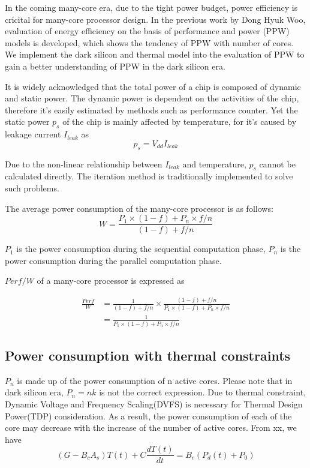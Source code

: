 In the coming many-core era, due to the tight power budget, power efficiency is cricital for
many-core processor design. In the previous work by Dong Hyuk Woo, evaluation of energy
efficiency on the basis of performance and power (PPW) models is developed, which shows the
tendency of PPW with number of cores. We implement the dark silicon and thermal model into the
evaluation of PPW to gain a better understanding of PPW in the dark silicon era.

It is widely acknowledged that the total power of a chip is composed of dynamic and 
static power. The dynamic power is dependent on the activities of the chip, therefore it's 
easily estimated by methods such as performance counter.
Yet the static power $p_{s}$ of the chip is mainly affected by temperature, for it's caused by
leakage current $I_{leak}$ as
\begin{equation}\label{ps}
p_{s} = V_{dd}I_{leak}
\end{equation}

Due to the non-linear relationship between $I_{leak}$ and temperature, $p_{s}$ cannot be
calculated directly. The iteration method is traditionally implemented to solve such problems.







The average power consumption of the many-core processor is as follows:
\begin{equation}\label{average_power}
W = \frac{P_{1} \times (1-f)+P_{n} \times f/n}{(1-f)+f/n}
\end{equation}

$P_{1}$ is the power consumption during the sequential computation phase, $P_{n}$ is the power 
consumption during the parallel computation phase. 

$Perf/W$ of a many-core processor is expressed as

\begin{equation}\label{ppw}
\begin{split}
\frac{Perf}{W} &= \frac{1}{(1-f)+f/n} \times \frac{(1-f)+f/n}{P_{1} \times (1-f)+P_{n} \times f/n}\\
&= \frac{1}{P_{1} \times (1-f)+P_{n} \times f/n}
\end{split}
\end{equation}


\subsection{Power consumption with thermal constraints}
$P_{n}$ is made up of the power consumption of n active cores. Please note that in dark silicon
era, $P_{n} = nk$ is not the correct expression. Due to thermal constraint, Dynamic Voltage and
Frequency Scaling(DVFS) is necessary for Thermal Design Power(TDP) consideration. As a result,
the power consumption of each of the core may decrease with the increase of the number of active cores.
From xx, we have
\begin{equation}\label{gt=bp}
(G - B_{c}A_{s})T(t) + C\frac{dT(t)}{dt}= B_{c}(P_{d}(t) + P_{0})
\end{equation}

